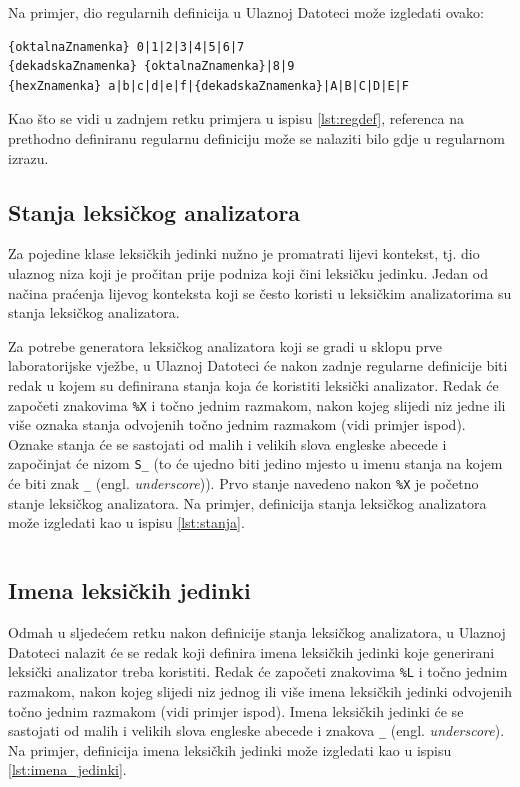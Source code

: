\documentclass[times, 12pt, utf8]{book}
\begin{document}
Na primjer, dio regularnih definicija u Ulaznoj Datoteci može izgledati ovako:

\begin{lstlisting}[caption={Primjer regularnih definicija u Ulaznoj Datoteci.},label=lst:regdef]
{oktalnaZnamenka} 0|1|2|3|4|5|6|7
{dekadskaZnamenka} {oktalnaZnamenka}|8|9
{hexZnamenka} a|b|c|d|e|f|{dekadskaZnamenka}|A|B|C|D|E|F
\end{lstlisting}

Kao što se vidi u zadnjem retku primjera u ispisu \ref{lst:regdef}, referenca na prethodno definiranu regularnu definiciju može se nalaziti bilo gdje u regularnom izrazu.

\subsection{Stanja leksičkog analizatora}
Za pojedine klase leksičkih jedinki nužno je promatrati lijevi kontekst, tj. dio ulaznog niza koji je pročitan prije podniza koji čini leksičku jedinku.
Jedan od načina praćenja lijevog konteksta koji se često koristi u leksičkim analizatorima su stanja leksičkog analizatora.

Za potrebe generatora leksičkog analizatora koji se gradi u sklopu prve laboratorijske vježbe, u Ulaznoj Datoteci će nakon zadnje regularne definicije biti redak u kojem su definirana stanja koja će koristiti leksički analizator.
Redak će započeti znakovima \verb=%X= i točno jednim razmakom, nakon kojeg slijedi niz jedne ili više oznaka stanja odvojenih točno jednim razmakom (vidi primjer ispod).
Oznake stanja će se sastojati od malih i velikih slova engleske abecede i započinjat će nizom \verb=S_= (to će ujedno biti jedino mjesto u imenu stanja na kojem će biti znak \verb=_= (engl. \emph{underscore})).
Prvo stanje navedeno nakon \verb=%X= je početno stanje leksičkog analizatora.
Na primjer, definicija stanja leksičkog analizatora može izgledati kao u ispisu \ref{lst:stanja}.

\begin{lstlisting}[caption={Primjer imena stanja u Ulaznoj Datoteci.},label=lst:stanja]
%X S_pocetno S_komentar S_unarniMinus
\end{lstlisting}

\subsection{Imena leksičkih jedinki}
Odmah u sljedećem retku nakon definicije stanja leksičkog analizatora, u Ulaznoj Datoteci nalazit će se redak koji definira imena leksičkih jedinki koje generirani leksički analizator treba koristiti.
Redak će započeti znakovima \verb=%L= i točno jednim razmakom, nakon kojeg slijedi niz jednog ili više imena leksičkih jedinki odvojenih točno jednim razmakom (vidi primjer ispod).
Imena leksičkih jedinki će se sastojati od malih i velikih slova engleske abecede i znakova \verb=_= (engl. \emph{underscore}).
Na primjer, definicija imena leksičkih jedinki može izgledati kao u ispisu \ref{lst:imena_jedinki}.
\end{document}
